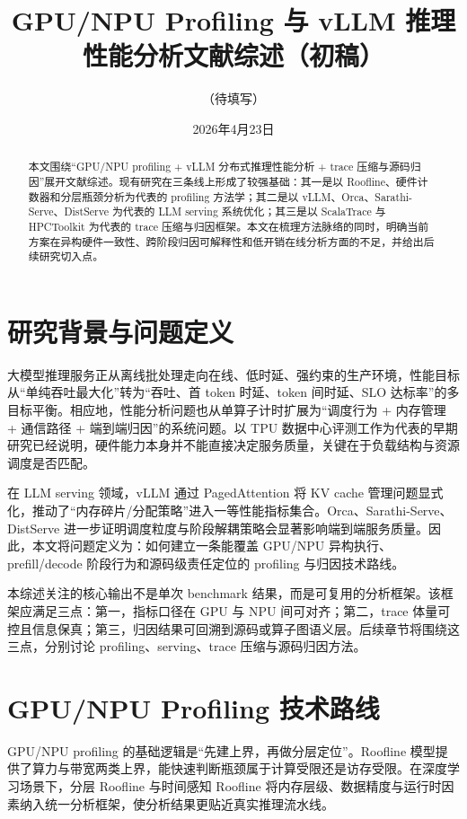 \documentclass[supercite]{Experimental_Report}
\title{GPU/NPU Profiling 与 vLLM 推理性能分析文献综述（初稿）}
\author{（待填写）}
\date{2026年4月23日}
\begin{document}
\maketitle
\clearpage
{}

\begin{abstract}
本文围绕“GPU/NPU profiling + vLLM 分布式推理性能分析 + trace 压缩与源码归因”展开文献综述。现有研究在三条线上形成了较强基础：其一是以 Roofline、硬件计数器和分层瓶颈分析为代表的 profiling 方法学；其二是以 vLLM、Orca、Sarathi-Serve、DistServe 为代表的 LLM serving 系统优化；其三是以 ScalaTrace 与 HPCToolkit 为代表的 trace 压缩与归因框架。本文在梳理方法脉络的同时，明确当前方案在异构硬件一致性、跨阶段归因可解释性和低开销在线分析方面的不足，并给出后续研究切入点。
\end{abstract}

\section{研究背景与问题定义}

大模型推理服务正从离线批处理走向在线、低时延、强约束的生产环境，性能目标从“单纯吞吐最大化”转为“吞吐、首 token 时延、token 间时延、SLO 达标率”的多目标平衡。相应地，性能分析问题也从单算子计时扩展为“调度行为 + 内存管理 + 通信路径 + 端到端归因”的系统问题。以 TPU 数据中心评测工作为代表的早期研究已经说明，硬件能力本身并不能直接决定服务质量，关键在于负载结构与资源调度是否匹配\cite{jouppi2017tpu}。

在 LLM serving 领域，vLLM 通过 PagedAttention 将 KV cache 管理问题显式化，推动了“内存碎片/分配策略”进入一等性能指标集合\cite{kwon2023pagedattention}。Orca、Sarathi-Serve、DistServe 进一步证明调度粒度与阶段解耦策略会显著影响端到端服务质量\cite{yu2022orca,agrawal2024sarathi,zhong2024distserve}。因此，本文将问题定义为：如何建立一条能覆盖 GPU/NPU 异构执行、prefill/decode 阶段行为和源码级责任定位的 profiling 与归因技术路线。

本综述关注的核心输出不是单次 benchmark 结果，而是可复用的分析框架。该框架应满足三点：第一，指标口径在 GPU 与 NPU 间可对齐；第二，trace 体量可控且信息保真；第三，归因结果可回溯到源码或算子图语义层。后续章节将围绕这三点，分别讨论 profiling、serving、trace 压缩与源码归因方法。

\section{GPU/NPU Profiling 技术路线}

GPU/NPU profiling 的基础逻辑是“先建上界，再做分层定位”。Roofline 模型提供了算力与带宽两类上界，能快速判断瓶颈属于计算受限还是访存受限\cite{roofline2009}。在深度学习场景下，分层 Roofline 与时间感知 Roofline 将内存层级、数据精度与运行时因素纳入统一分析框架，使分析结果更贴近真实推理流水线\cite{yang2020hierarchicalroofline,wang2020timebasedroofline}。
\end{document}
